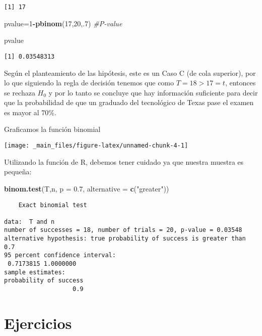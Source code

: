 \documentclass[
  a4paper,
  oneside,
  openany]{book}
\newenvironment{Shaded}{\begin{snugshade}}{\end{snugshade}}
\newcommand{\CommentTok}[1]{\textcolor[rgb]{0.56,0.35,0.01}{\textit{#1}}}
\newcommand{\DataTypeTok}[1]{\textcolor[rgb]{0.13,0.29,0.53}{#1}}
\newcommand{\DecValTok}[1]{\textcolor[rgb]{0.00,0.00,0.81}{#1}}
\newcommand{\FloatTok}[1]{\textcolor[rgb]{0.00,0.00,0.81}{#1}}
\newcommand{\KeywordTok}[1]{\textcolor[rgb]{0.13,0.29,0.53}{\textbf{#1}}}
\newcommand{\NormalTok}[1]{#1}
\newcommand{\OperatorTok}[1]{\textcolor[rgb]{0.81,0.36,0.00}{\textbf{#1}}}
\newcommand{\StringTok}[1]{\textcolor[rgb]{0.31,0.60,0.02}{#1}}
\begin{document}
\begin{verbatim}
[1] 17
\end{verbatim}

\begin{Shaded}
\begin{Highlighting}[]
\NormalTok{pvalue=}\DecValTok{1}\OperatorTok{{-}}\KeywordTok{pbinom}\NormalTok{(}\DecValTok{17}\NormalTok{,}\DecValTok{20}\NormalTok{,.}\DecValTok{7}\NormalTok{)                 }\CommentTok{\#P{-}value}

\NormalTok{pvalue}
\end{Highlighting}
\end{Shaded}

\begin{verbatim}
[1] 0.03548313
\end{verbatim}

Según el planteamiento de las hipótesis, este es un Caso C (de cola superior), por lo que siguiendo la regla de decisión tenemos que como \(T=18>17=t\), entonces se rechaza \(H_0\) y por lo tanto se concluye que hay información suficiente para decir que la probabilidad de que un graduado del tecnológico de Texas pase el examen es mayor al 70\%.

Graficamos la función binomial

\begin{center}\texttt{[image: \_main\_files/figure-latex/unnamed-chunk-4-1]} \end{center}

Utilizando la función de R, debemos tener cuidado ya que nuestra muestra es pequeña:

\begin{Shaded}
\begin{Highlighting}[]
\KeywordTok{binom.test}\NormalTok{(T,n, }\DataTypeTok{p =} \FloatTok{0.7}\NormalTok{, }\DataTypeTok{alternative =} \KeywordTok{c}\NormalTok{(}\StringTok{"greater"}\NormalTok{))}
\end{Highlighting}
\end{Shaded}

\begin{verbatim}
    Exact binomial test

data:  T and n
number of successes = 18, number of trials = 20, p-value = 0.03548
alternative hypothesis: true probability of success is greater than 0.7
95 percent confidence interval:
 0.7173815 1.0000000
sample estimates:
probability of success 
                   0.9 
\end{verbatim}

\hypertarget{ejercicios}{%
\section{Ejercicios}\label{ejercicios}}
\end{document}
